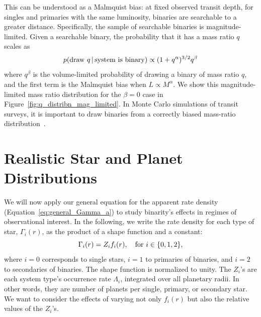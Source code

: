 \documentclass[12pt,modern]{aastex61}
\begin{document}
This can be understood as a Malmquist bias: at fixed observed transit
depth, for singles and primaries with the same luminosity, binaries
are searchable to a greater distance.  Specifically, the sample of
searchable binaries is magnitude-limited.  Given a searchable binary,
the probability that it has a mass ratio $q$ scales as
\begin{equation}
    p({\rm draw\ }q\,|\,{\rm system\ is\ binary}) \propto
    (1+q^\alpha)^{3/2} q^\beta 
    \label{eq:Malmquist_bias}
\end{equation}
where $q^\beta$ is the volume-limited probability of drawing a binary
of mass ratio $q$, and the first term is the Malmquist bias when
$L\propto M^\alpha$.  We show this magnitude-limited mass ratio
distribution for the $\beta=0$ case in
Figure~\ref{fig:q_distribn_mag_limited}.  In Monte Carlo simulations
of transit surveys, it is important to draw binaries from a correctly
biased mass-ratio distribution~\citep[\textit{e.g.},][]{
  bakos_hatsouth:_2013,sullivan_transiting_2015, gunther_new_2017}.




\section{Realistic Star and Planet Distributions}
\label{sec:more_complicated}

We will now apply our general equation for the apparent rate density
(Equation~\ref{eq:general_Gamma_a}) to study binarity's effects in
regimes of observational interest.  In the following, we write the
rate density for each type of star, $\Gamma_i(r)$, as the product of a
shape function and a constant:
\begin{equation}
    \Gamma_i(r) = Z_i f_i(r), \quad {\rm for\ }i\in\{0,1,2\},
\end{equation}
where $i=0$ corresponds to single stars, $i=1$ to primaries of
binaries, and $i=2$ to secondaries of binaries.  The shape function is
normalized to unity.  The $Z_i$'s are each system type's occurrence
rate $\Lambda_i$, integrated over all planetary radii. In other words,
they are number of planets per single, primary, or secondary star.  We
want to consider the effects of varying not only $f_i(r)$ but also the
relative values of the $Z_i$'s.

\end{document}
